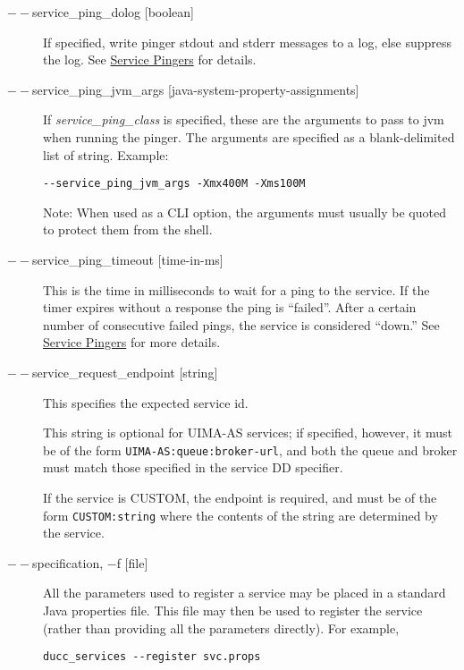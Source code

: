 \begin{description}
      \item[$--$service\_ping\_dolog {[boolean]}] If specified, write pinger stdout and stderr
        messages to a log, else suppress the log. See \hyperref[sec:service.pingers]{Service Pingers}
        for details.

      \item[$--$service\_ping\_jvm\_args {[java-system-property-assignments]}] If 
        {\em service\_ping\_class} is specified, these are the arguments 
        to pass to jvm when running the pinger. The arguments are specified as a blank-delimited
        list of string.  Example:
\begin{verbatim}
--service_ping_jvm_args -Xmx400M -Xms100M
\end{verbatim}
        
        Note: When used as a CLI option, the arguments must usually be
        quoted to protect them from the shell.

      \item[$--$service\_ping\_timeout {[time-in-ms]}] This is the time in milliseconds to wait for a
        ping to the service.  If the timer expires without a response the ping is ``failed''. After
        a certain number of consecutive failed pings, the service is considered ``down.''  See
        \hyperref[sec:service.pingers]{Service Pingers} for more details.

      \item[$--$service\_request\_endpoint {[string]}] This specifies the expected service id.  

        This string is optional for UIMA-AS services; if specified, however, it must be of the
        form {\tt UIMA-AS:queue:broker-url}, and both the queue and broker must match those specified in the
        service DD specifier.

        If the service is CUSTOM, the endpoint is required, and must be of the form
        {\tt CUSTOM:string} where the contents of the string are determined by the service.

      \item[$--$specification, $-$f {[file]}] All the parameters used to register a service may be placed in a
        standard Java properties file.  This file may then be used to register the service (rather than
        providing all the parameters directly).
        For example, 

\begin{verbatim}
ducc_services --register svc.props 
\end{verbatim}
        

\end{description}

